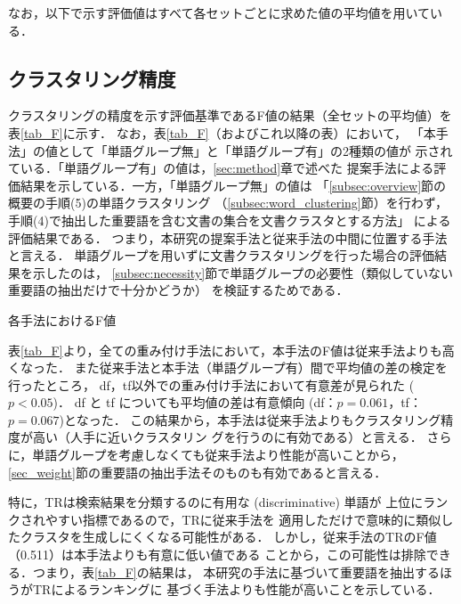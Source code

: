 \documentclass[japanese]{jnlp_1.4}
\begin{document}
{なお，以下で示す評価値はすべて各セットごとに求めた値の平均値を用いている．



\subsection{クラスタリング精度} \label{subsec:F}

クラスタリングの精度を示す評価基準であるF値の結果（全セットの平均値）を表\ref{tab_F}に示す．
なお，表\ref{tab_F}（およびこれ以降の表）において，
「本手法」の値として「単語グループ無」と「単語グループ有」の2種類の値が
示されている．「単語グループ有」の値は，\ref{sec:method}章で述べた
提案手法による評価結果を示している．一方，「単語グループ無」の値は
「\ref{subsec:overview}節の概要の手順(5)の単語クラスタリング
（\ref{subsec:word_clustering}節）を行わず，
手順(4)で抽出した重要語を含む文書の集合を文書クラスタとする方法」
による評価結果である．
つまり，本研究の提案手法と従来手法の中間に位置する手法と言える．
単語グループを用いずに文書クラスタリングを行った場合の評価結果を示したのは，
\ref{subsec:necessity}節で単語グループの必要性（類似していない重要語の抽出だけで十分かどうか）
を検証するためである．

\begin{table}[t]
\caption{各手法におけるF値} \label{tab_F}

\end{table}

表\ref{tab_F}より，全ての重み付け手法において，本手法のF値は従来手法よりも高くなった．
また従来手法と本手法（単語グループ有）間で平均値の差の検定を行ったところ，
df，tf以外での重み付け手法において有意差が見られた ({$p<0.05$})．
df と tf についても平均値の差は有意傾向 (df：{$p=0.061$}，tf：{$p=0.067$})となった．
この結果から，本手法は従来手法よりもクラスタリング精度が高い（人手に近いクラスタリン
グを行うのに有効である）と言える．
さらに，単語グループを考慮しなくても従来手法より性能が高いことから，
\ref{sec_weight}節の重要語の抽出手法そのものも有効であると言える．

特に，TRは検索結果を分類するのに有用な (discriminative) 単語が
上位にランクされやすい指標である\cite{Gelgi07}ので，TRに従来手法を
適用しただけで意味的に類似したクラスタを生成しにくくなる可能性がある．
しかし，従来手法のTRのF値（0.511）は本手法よりも有意に低い値である
ことから，この可能性は排除できる．つまり，表\ref{tab_F}の結果は，
本研究の手法に基づいて重要語を抽出するほうがTRによるランキングに
基づく手法よりも性能が高いことを示している．



}
\end{document}
